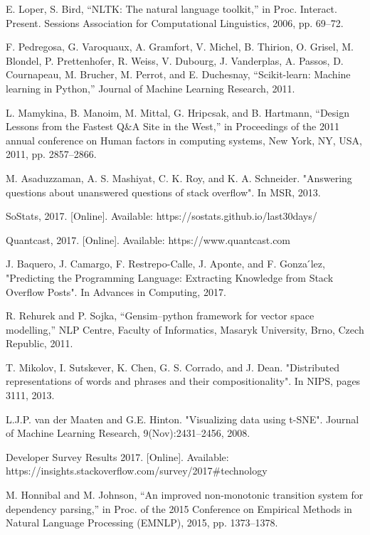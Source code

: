 \documentclass[letterpaper, 10 pt, conference]{ieeeconf}  %
\begin{document}
\begin{thebibliography}{99}
E. Loper, S. Bird, “NLTK: The natural language toolkit,” in Proc. Interact. Present. Sessions Association for Computational Linguistics, 2006, pp. 69–72.
 
F. Pedregosa, G. Varoquaux, A. Gramfort, V. Michel, B. Thirion, O. Grisel, M.  Blondel, P. Prettenhofer, R. Weiss, V. Dubourg, J. Vanderplas, A. Passos, D. Cournapeau, M. Brucher, M. Perrot, and E. Duchesnay, “Scikit-learn: Machine learning in Python,” Journal of Machine Learning
Research, 2011.
 
L. Mamykina, B. Manoim, M. Mittal, G. Hripcsak, and B. Hartmann, “Design Lessons from the Fastest Q\&A Site in the West,” in Proceedings of the 2011 annual conference on Human factors in computing systems, New York, NY, USA, 2011, pp. 2857–2866.


 
M. Asaduzzaman, A. S. Mashiyat, C. K. Roy, and K. A. Schneider. "Answering questions about unanswered questions of stack overflow". In MSR, 2013.

 
 SoStats, 2017. [Online]. Available: https://sostats.github.io/last30days/

 
 Quantcast, 2017. [Online]. Available: https://www.quantcast.com
 
 J. Baquero, J. Camargo, F. Restrepo-Calle, J. Aponte, and F. Gonza ́lez, "Predicting the Programming Language: Extracting Knowledge from Stack Overflow Posts". In Advances in Computing, 2017. 
 
 R. Rehurek and P. Sojka, “Gensim–python framework for vector space modelling,” NLP Centre, Faculty of Informatics, Masaryk University, Brno, Czech Republic, 2011.
 
 T. Mikolov, I. Sutskever, K. Chen, G. S. Corrado, and J. Dean. "Distributed representations of words and phrases and their compositionality". In NIPS, pages 3111, 2013.

 L.J.P. van der Maaten and G.E. Hinton. "Visualizing data using t-SNE". Journal of Machine Learning Research, 9(Nov):2431–2456, 2008.

 Developer Survey Results 2017. [Online].  Available: https://insights.stackoverflow.com/survey/2017\#technology

 M. Honnibal and M. Johnson, “An improved non-monotonic transition system for dependency parsing,” in Proc. of the 2015 Conference on Empirical Methods in Natural Language Processing (EMNLP), 2015, pp. 1373–1378.

\end{thebibliography}
\end{document}
